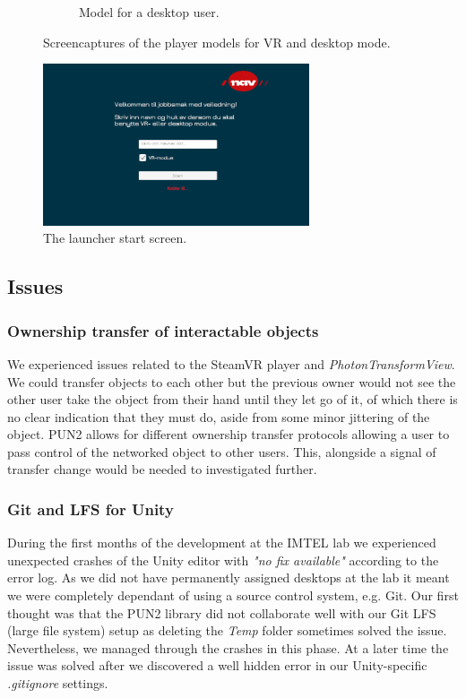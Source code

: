 \begin{figure}[]
\begin{subfigure}[b]{0.29\textwidth}
    \caption{Model for a desktop user.}
    \label{fig:phase1Desktopmode}
  \end{subfigure}
  \hfill%
  \caption{Screencaptures of the player models for VR and desktop mode.}
  \label{fig:phase1PlayerModels}
\end{figure}

\begin{figure}[]
  \centering
    \captionsetup{width=.7\linewidth}
    \includegraphics[width=0.7\textwidth]{fig/phase_1/launcher1.PNG}
 \caption{The launcher start screen.}
\label{fig:launcherPhase1}
\end{figure}



\subsection{Issues}

\subsubsection{Ownership transfer of interactable objects}
We experienced issues related to the SteamVR player and \textit{PhotonTransformView}. We could transfer objects to each other but the previous owner would not see the other user take the object from their hand until they let go of it, of which there is no clear indication that they must do, aside from some minor jittering of the object. PUN2 allows for different ownership transfer protocols allowing a user to pass control of the networked object to other users.  This, alongside a signal of transfer change would be needed to investigated further. 

\subsubsection{Git and LFS for Unity}
During the first months of the development at the IMTEL lab we experienced unexpected crashes of the Unity editor with \textit{"no fix available"} according to the error log. As we did not have permanently assigned desktops at the lab it meant we were completely dependant of using a source control system, e.g. Git. Our first thought was that the PUN2 library did not collaborate well with our Git LFS (large file system) setup as deleting the \textit{Temp} folder sometimes solved the issue. Nevertheless, we managed through the crashes in this phase. At a later time the issue was solved after we discovered a well hidden error in our Unity-specific \textit{.gitignore} settings.   



